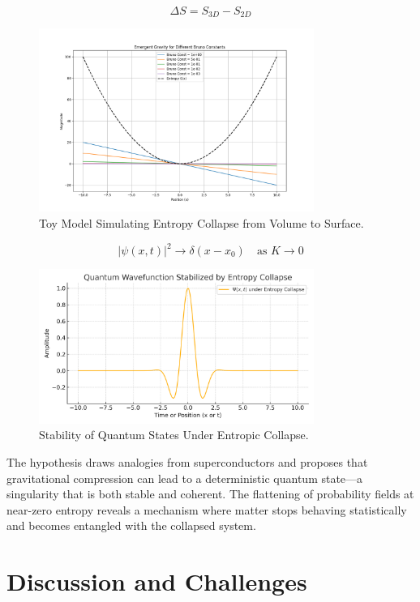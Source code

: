 \documentclass[12pt]{article}
\begin{document}
\[
\Delta S = S_{3D} - S_{2D}
\]

\begin{figure}[H]

    \centering
    \includegraphics[width=0.8\textwidth]{fig_06_toy_model_entropy.png}
    \caption{Toy Model Simulating Entropy Collapse from Volume to Surface.}
    \label{fig:toy_model}
\end{figure}

\[ |\psi(x,t)|^2 \rightarrow \delta(x - x_0) \quad \text{as } K \rightarrow 0 \]

\begin{figure}[H]
    \centering
    \includegraphics[width=0.8\textwidth]{fig_05_wavefunction_stability.png}
    \caption{Stability of Quantum States Under Entropic Collapse.}
    \label{fig:wavefunction_stability}
\end{figure}

The hypothesis draws analogies from superconductors and proposes that gravitational compression can lead to a deterministic quantum state—a singularity that is both stable and coherent. The flattening of probability fields at near-zero entropy reveals a mechanism where matter stops behaving statistically and becomes entangled with the collapsed system.

\section{Discussion and Challenges}
\end{document}
